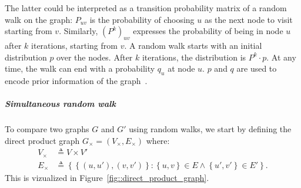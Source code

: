                 The latter could be interpreted as a transition probability matrix of a random walk on the graph:
                $P_{uv}$ is the probability of choosing $u$ as the next node to visit starting from $v$.
                Similarly, $\left(P^k\right)_{uv}$ expresses the probability of being in node $u$ after $k$ iterations, starting from $v$.
                A random walk starts with an initial distribution $p$ over the nodes.
                After $k$ iterations, the distribution is $P^k\cdot p$.
                At any time, the walk can end with a probability $q_u$ at node $u$.
                $p$ and $q$ are used to encode prior information of the graph~\parencite{vishwanathan2010graph}.\\
                
                \subparagraph{Simultaneous random walk}
                    To compare two graphs \(G\) and \(G'\) using random walks, we start by defining the direct product graph $G_{\times} = \left(V_{\times}, E_{\times}\right)$ where:
                    \begin{align}
                        \label{eq::direct_product_graph}
                        V_{\times} &\triangleq V \times V'\\
                        E_{\times} &\triangleq \left\{\left\{(u, u'), (v, v')\right\}: \left\{u,v\right\} \in E \wedge \left\{u',v'\right\} \in E'\right\}.
                    \end{align}
                    This is vizualized in Figure~\ref{fig::direct_product_graph}.
